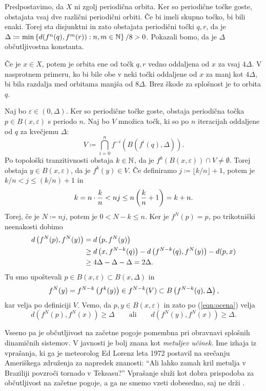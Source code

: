 \begin{dokaz}
    Predpostavimo, da \(X\) ni zgolj periodična orbita. Ker so periodične točke goste, obstajata vsaj dve različni periodični orbiti. Če bi imeli skupno točko, bi bili enaki. Torej sta disjunktni in zato obstajata periodični točki \(q, r\), da je \(\Delta \coloneq \min \left\{ d (f^n (q), f^m (r)) : n, m \in \mathbb N \right\} / 8 > 0\). Pokazali bomo, da je \(\Delta\) občutljivostna konstanta.

    Če je \(x \in X\), potem je orbita ene od točk \(q, r\) vedno oddaljena od \(x\) za vsaj \(4 \Delta\). V nasprotnem primeru, ko bi bile obe v neki točki oddaljene od \(x\) za manj kot \(4 \Delta\), bi bila razdalja med orbitama manjša od \(8 \Delta\). Brez škode za splošnost je to orbita \(q\).

    Naj bo \(\varepsilon \in (0, \Delta)\). Ker so periodične točke goste, obstaja periodična točka \(p \in B (x, \varepsilon)\) s periodo \(n\). Naj bo \(V\) množica točk, ki so po \(n\) iteracijah oddaljene od \(q\) za kvečjemu \(\Delta\):
    \[V \coloneq \bigcap_{i = 0}^n f^{- i} (B (f^i (q), \Delta)).\]
    Po topološki tranzitivnosti obstaja \(k \in \mathbb N\), da je \(f^k (B (x, \varepsilon)) \cap V \neq \emptyset\). Torej obstaja \(y \in B (x, \varepsilon)\), da je \(f^k (y) \in V\). Če definiramo \(j \coloneq \lfloor k / n \rfloor + 1\), potem je \(k / n < j \leq (k / n) + 1\) in
    \[k = n \cdot \frac{k}{n} < n j \leq n \left( \frac{k}{n} + 1 \right) = k + n.\]
    Torej, če je \(N \coloneq n j\), potem je \(0 < N - k \leq n\). Ker je \(f^N (p) = p\), po trikotniški neenakosti dobimo
    \begin{align}
        d \left( f^N (p), f^N (y) \right) &= d \left( p, f^N (y) \right) \nonumber\\
        &\geq d \left( x, f^{N - k} (q) \right) - d \left( f^{N - k} (q), f^N (y) \right) - d (p, x) \label{eqn:ocena}\\
        &\geq 4 \Delta - \Delta - \Delta = 2 \Delta. \nonumber
    \end{align}
    Tu smo upoštevali \(p \in B (x, \varepsilon) \subset B (x, \Delta)\) in
    \[f^N (y) = f^{N - k} \left( f^k (y) \right) \in f^{N - k} (V) \subset B \left( f^{N - k} (q), \Delta \right),\]
    kar velja po definiciji \(V\). Vemo, da \(p, y \in B (x, \varepsilon)\) in zato po (\ref{eqn:ocena}) velja
    \[d (f^N (p), f^N (x)) \geq \Delta \qquad \text{ali} \qquad d (f^N (y), f^N (x)) \geq \Delta.\]
\end{dokaz}

\noindent Vseeno pa je občutljivost na začetne pogoje pomembna pri obravnavi splošnih dinamičnih sistemov. V javnosti je bolj znana kot \emph{metuljev učinek}. Ime izhaja iz vprašanja, ki ga je meteorolog Ed Lorenz leta \num{1972} postavil na srečanju Ameriškega združenja za napredek znanosti: ``Ali lahko zamah kril metulja v Braziliji povzroči tornado v Teksasu?'' Vprašanje služi kot dobra prispodoba za občutljivost na začetne pogoje, a ga ne smemo vzeti dobesedno, saj ne drži \cite{Pielke_2024}.

